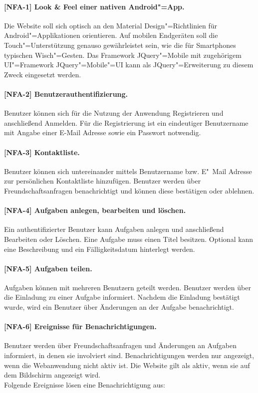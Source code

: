 \paragraph{[NFA-1] Look \& Feel einer nativen Android"=App.} Die Website soll sich optisch an den \glqq Material Design\grqq "=Richtlinien für Android"=Applikationen orientieren. Auf mobilen Endgeräten soll die Touch"=Unterstützung genauso gewährleistet sein, wie die für Smartphones typischen Wisch"=Gesten. Das Framework \glqq JQuery"=Mobile\grqq{} mit zugehörigem UI"=Framework \glqq JQuery"=Mobile"=UI\grqq{} kann als JQuery"=Erweiterung zu diesem Zweck eingesetzt werden.

\paragraph{[NFA-2] Benutzerauthentifizierung.} Benutzer können sich für die Nutzung der Anwendung Registrieren und anschließend Anmelden. Für die Registrierung ist ein eindeutiger Benutzername mit Angabe einer E-Mail Adresse sowie ein Passwort notwendig.

\paragraph{[NFA-3] Kontaktliste.} Benutzer können sich untereinander mittels Benutzername bzw. E"~Mail Adresse zur persönlichen Kontaktliste hinzufügen. Benutzer werden über Freundschaftsanfragen benachrichtigt und können diese bestätigen oder ablehnen.

\paragraph{[NFA-4] Aufgaben anlegen, bearbeiten und löschen.} Ein authentifizierter Benutzer kann Aufgaben anlegen und anschließend Bearbeiten oder Löschen. Eine Aufgabe muss einen Titel besitzen. Optional kann eine Beschreibung und ein Fälligkeitsdatum hinterlegt werden.

\paragraph{[NFA-5] Aufgaben teilen.} Aufgaben können mit mehreren Benutzern geteilt werden. Benutzer werden über die Einladung zu einer Aufgabe informiert. Nachdem die Einladung bestätigt wurde, wird ein Benutzer über Änderungen an der Aufgabe benachrichtigt.

\paragraph{[NFA-6] Ereignisse für Benachrichtigungen.} Benutzer werden über Freundschaftsanfragen und Änderungen an Aufgaben informiert, in denen sie involviert sind. Benachrichtigungen werden nur angezeigt, wenn die Webanwendung nicht aktiv ist. Die Website gilt als \glqq aktiv\grqq, wenn sie auf dem Bildschirm angezeigt wird. \\
Folgende Ereignisse lösen eine Benachrichtigung aus:

